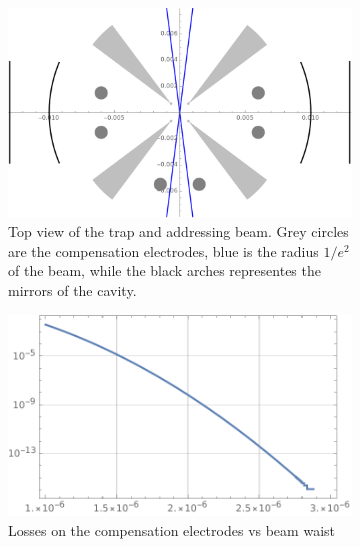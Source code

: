 \begin{figure}[H]
     \centering
     \begin{subfigure}[b]{0.49\textwidth}
     \centering
     \includegraphics[width=\textwidth]{img/clipping}
     \caption{Top view of the trap and addressing beam. Grey circles are the compensation electrodes, blue is the radius $1/e^2$ of the beam, while the black arches representes the mirrors of the cavity.}
     \label{clippingtop}
     \end{subfigure}
     \hfill
     \begin{subfigure}[b]{0.49\textwidth}
      \centering
        \includegraphics[width=\textwidth]{img/Plosses}
        \caption{Losses on the compensation electrodes vs beam waist}
        \label{lossesplot}
     \end{subfigure}
        \caption{}
\end{figure}


